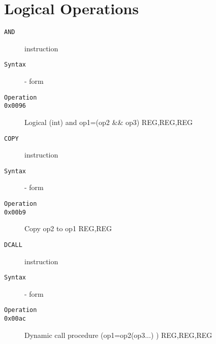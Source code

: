 \section{Logical Operations}
\begin{description}
\item[\texttt{AND}] instruction\\
\item[\texttt{Syntax}] - form \\

\item[\texttt{Operation}]
\item[\texttt{}]
\item[\texttt{0x0096}] Logical (int) and op1=(op2 \&\& op3)  {REG,REG,REG}       \\
\end{description}
\clearpage
\begin{description}
\item[\texttt{COPY}] instruction\\
\item[\texttt{Syntax}] - form \\

\item[\texttt{Operation}]
\item[\texttt{}]
\item[\texttt{0x00b9}] Copy op2 to op1  {REG,REG}           \\
\end{description}
\clearpage
\begin{description}
\item[\texttt{DCALL}] instruction\\
\item[\texttt{Syntax}] - form \\

\item[\texttt{Operation}]
\item[\texttt{}]
\item[\texttt{0x00ac}] Dynamic call procedure (op1=op2(op3...) )  {REG,REG,REG}       \\
\end{description}

